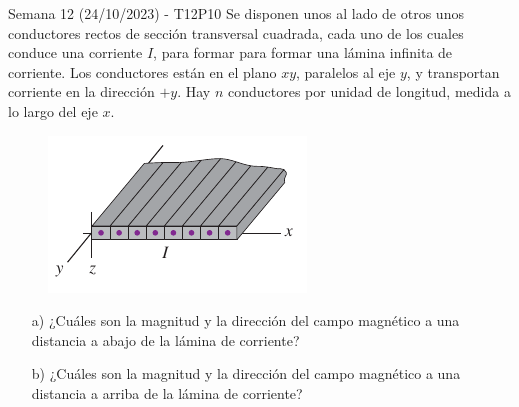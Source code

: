 \begin{frame}{Semana 12 (24/10/2023) - T12P10}
    Se disponen unos al lado de otros unos conductores rectos de sección transversal cuadrada, cada uno de los cuales conduce una corriente $I$, para formar para formar una lámina infinita de corriente. Los conductores están en el plano $xy$, paralelos al eje $y$, y transportan corriente en la dirección $+y$. Hay $n$ conductores por unidad de longitud, medida a lo largo del eje $x$.
    
    \begin{figure}
        \centering
        \includegraphics[scale=0.4]{figures/t14p4.png}
    \end{figure}
    
    \begin{itemize}
        \item[a)] ¿Cuáles son la magnitud y la dirección del campo magnético a una distancia a abajo de la lámina de corriente?
        \item[b)] ¿Cuáles son la magnitud y la dirección del campo magnético a una distancia a arriba de la lámina de corriente?
    \end{itemize}
\end{frame}

